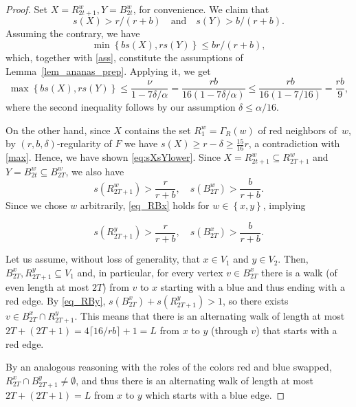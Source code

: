 \documentclass[12pt,reqno]{amsart}
\theoremstyle{definition}
\newcommand{\x}{\rs{\sx}}
\newcommand{\y}{\rs{\sy}}
\newcommand{\sx}{X}
\newcommand{\sy}{Y}
\newcommand{\rs}[1]{s(#1)}
\begin{document}
\begin{proof}
 Set $X = R^w_{2t + 1}, Y = B^w_{2t}$, for convenience.
 We claim that
 \begin{equation}
\label{eq:sXsYlower}
	 \x > r/(r + b)\quad\text{and}\quad\y > b/(r + b).
 \end{equation}
 Assuming the contrary, we have
 \[
   \min \left\{ b\x, r\y \right\} \le br/(r + b),
 \]
  which, together with \eqref{ass}, constitute the assumptions of
Lemma~\ref{lem_ananas_prep}. Applying it, we get
 \begin{equation}
   \label{max}
 \max \left\{ b\x, r\y \right\} \le \frac{\nu}{1 - 7\delta/\alpha} = \frac{rb}{16(1 - 7\delta/\alpha)} \le \frac{rb}{16(1 - 7/16)} = \frac{rb}{9},
 \end{equation}
 where the second inequality follows by our assumption $\delta \le \alpha/16$.

  On the other hand, since $X$ contains the set $R^w_1 = \Gamma_R(w)$ of red neighbors of~$w$, by $(r, b, \delta)$-regularity of $F$ we have $\x \ge r - \delta \ge \frac{15}{16}r$,  a contradiction with \eqref{max}.
  Hence, we have shown \eqref{eq:sXsYlower}. Since $X = R^w_{2t + 1}\subseteq R^w_{2T + 1}$ and $Y = B^w_{2t}\subseteq B^w_{2T}$, we also have
\begin{equation}
  \label{eq_RBx}
\rs{R^w_{2T + 1}} > \frac{r}{r + b}, \quad \rs{B^w_{2T}} > \frac{b}{r + b}.
\end{equation}
Since we chose $w$ arbitrarily, \eqref{eq_RBx} holds for $w \in \left\{ x,y \right\}$, implying

\begin{equation}
  \label{eq_RBy}
  \rs{R^y_{2T + 1}} > \frac{r}{r + b}, \quad \rs{B^x_{2T}} > \frac{b}{r + b}.
\end{equation}

Let us assume, without loss of generality, that $x \in V_1$ and $y \in V_2$. Then, $B^x_{2T}, R^y_{2T + 1}\subseteq V_1$ and, in particular, for every vertex $v\in B^x_{2T}$ there is a walk (of even length at most $2T$) from $v$ to $x$ starting with a blue and thus ending with a red edge. By \eqref{eq_RBy}, $\rs{B^x_{2T}} + \rs{R^y_{2T + 1}} > 1$, so there exists $v \in B^x_{2T} \cap R^y_{2T + 1}$.  This means that there is an alternating walk of length at most $2T + (2T + 1)= 4\lceil 16/rb \rceil + 1 = L$ from $x$ to $y$ (through $v$) that starts with a red edge.

By an analogous reasoning with the roles of the colors red and blue swapped,  $R^x_{2T}\cap B^y_{2T + 1}\neq \emptyset$, and thus there is an alternating walk  of length at most $2T + (2T + 1) = L $ from $x$ to $y$ which starts with a blue edge.
\end{proof}
\end{document}
